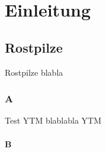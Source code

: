 \chapter{Einleitung}
\section{Rostpilze}
Rostpilze blabla \citep{Link2014}
\subsection{A}
Test \ac{YTM} blablabla \ac{YTM}
\subsubsection{B}